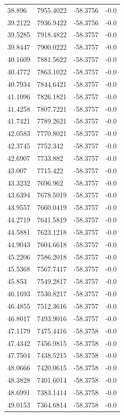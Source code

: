 \begin{table}[H]
\begin{tabular}{llll}
38.896 & 7955.4022 & -58.3756 & -0.0 \\
39.2122 & 7936.9422 & -58.3756 & -0.0 \\
39.5285 & 7918.4822 & -58.3757 & -0.0 \\
39.8447 & 7900.0222 & -58.3757 & -0.0 \\
40.1609 & 7881.5622 & -58.3757 & -0.0 \\
40.4772 & 7863.1022 & -58.3757 & -0.0 \\
40.7934 & 7844.6421 & -58.3757 & -0.0 \\
41.1096 & 7826.1821 & -58.3757 & -0.0 \\
41.4258 & 7807.7221 & -58.3757 & -0.0 \\
41.7421 & 7789.2621 & -58.3757 & -0.0 \\
42.0583 & 7770.8021 & -58.3757 & -0.0 \\
42.3745 & 7752.342 & -58.3757 & -0.0 \\
42.6907 & 7733.882 & -58.3757 & -0.0 \\
43.007 & 7715.422 & -58.3757 & -0.0 \\
43.3232 & 7696.962 & -58.3757 & -0.0 \\
43.6394 & 7678.5019 & -58.3757 & -0.0 \\
43.9557 & 7660.0419 & -58.3757 & -0.0 \\
44.2719 & 7641.5819 & -58.3757 & -0.0 \\
44.5881 & 7623.1218 & -58.3757 & -0.0 \\
44.9043 & 7604.6618 & -58.3757 & -0.0 \\
45.2206 & 7586.2018 & -58.3757 & -0.0 \\
45.5368 & 7567.7417 & -58.3757 & -0.0 \\
45.853 & 7549.2817 & -58.3757 & -0.0 \\
46.1693 & 7530.8217 & -58.3757 & -0.0 \\
46.4855 & 7512.3616 & -58.3757 & -0.0 \\
46.8017 & 7493.9016 & -58.3757 & -0.0 \\
47.1179 & 7475.4416 & -58.3758 & -0.0 \\
47.4342 & 7456.9815 & -58.3758 & -0.0 \\
47.7504 & 7438.5215 & -58.3758 & -0.0 \\
48.0666 & 7420.0615 & -58.3758 & -0.0 \\
48.3828 & 7401.6014 & -58.3758 & -0.0 \\
48.6991 & 7383.1414 & -58.3758 & -0.0 \\
49.0153 & 7364.6814 & -58.3758 & -0.0 \\

\end{tabular}
\end{table}
